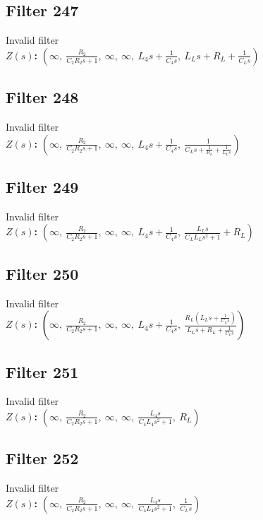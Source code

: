 \documentclass{article}
\begin{document}
\subsection*{Filter 247}
Invalid filter \\ 
\textbf{$Z(s)$:} $\left( \infty, \  \frac{R_{2}}{C_{2} R_{2} s + 1}, \  \infty, \  \infty, \  L_{4} s + \frac{1}{C_{4} s}, \  L_{L} s + R_{L} + \frac{1}{C_{L} s}\right)$ \\ 
\subsection*{Filter 248}
Invalid filter \\ 
\textbf{$Z(s)$:} $\left( \infty, \  \frac{R_{2}}{C_{2} R_{2} s + 1}, \  \infty, \  \infty, \  L_{4} s + \frac{1}{C_{4} s}, \  \frac{1}{C_{L} s + \frac{1}{R_{L}} + \frac{1}{L_{L} s}}\right)$ \\ 
\subsection*{Filter 249}
Invalid filter \\ 
\textbf{$Z(s)$:} $\left( \infty, \  \frac{R_{2}}{C_{2} R_{2} s + 1}, \  \infty, \  \infty, \  L_{4} s + \frac{1}{C_{4} s}, \  \frac{L_{L} s}{C_{L} L_{L} s^{2} + 1} + R_{L}\right)$ \\ 
\subsection*{Filter 250}
Invalid filter \\ 
\textbf{$Z(s)$:} $\left( \infty, \  \frac{R_{2}}{C_{2} R_{2} s + 1}, \  \infty, \  \infty, \  L_{4} s + \frac{1}{C_{4} s}, \  \frac{R_{L} \left(L_{L} s + \frac{1}{C_{L} s}\right)}{L_{L} s + R_{L} + \frac{1}{C_{L} s}}\right)$ \\ 
\subsection*{Filter 251}
Invalid filter \\ 
\textbf{$Z(s)$:} $\left( \infty, \  \frac{R_{2}}{C_{2} R_{2} s + 1}, \  \infty, \  \infty, \  \frac{L_{4} s}{C_{4} L_{4} s^{2} + 1}, \  R_{L}\right)$ \\ 
\subsection*{Filter 252}
Invalid filter \\ 
\textbf{$Z(s)$:} $\left( \infty, \  \frac{R_{2}}{C_{2} R_{2} s + 1}, \  \infty, \  \infty, \  \frac{L_{4} s}{C_{4} L_{4} s^{2} + 1}, \  \frac{1}{C_{L} s}\right)$ \\ 
\end{document}
